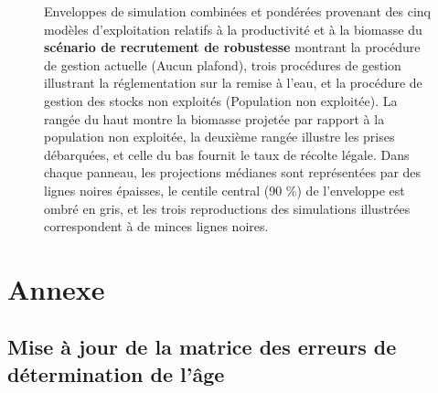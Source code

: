 \documentclass[11pt]{book}
\begin{document}
\begin{landscape}
\begin{figure}[htb]
{\centering {} 

}

\caption{Enveloppes de simulation combinées et pondérées provenant des cinq modèles d’exploitation relatifs à la productivité et à la biomasse du \textbf{scénario de recrutement de robustesse} montrant la procédure de gestion actuelle (Aucun plafond), trois procédures de gestion illustrant la réglementation sur la remise à l’eau, et la procédure de gestion des stocks non exploités (Population non exploitée). La rangée du haut montre la biomasse projetée par rapport à la population non exploitée, la deuxième rangée illustre les prises débarquées, et celle du bas fournit le taux de récolte légale. Dans chaque panneau, les projections médianes sont représentées par des lignes noires épaisses, le centile central (90 \%) de l’enveloppe est ombré en gris, et les trois reproductions des simulations illustrées correspondent à de minces lignes noires.}\label{fig:unnamed-chunk-26}
\end{figure}
\end{landscape}
\hypertarget{annexe}{%
\section{\texorpdfstring{Annexe \label{sec:app-minor}}{Annexe }}\label{annexe}}

\hypertarget{mise-uxe0-jour-de-la-matrice-des-erreurs-de-duxe9termination-de-luxe2ge}{%
\subsection{Mise à jour de la matrice des erreurs de détermination de l'âge}\label{mise-uxe0-jour-de-la-matrice-des-erreurs-de-duxe9termination-de-luxe2ge}}
\end{document}
